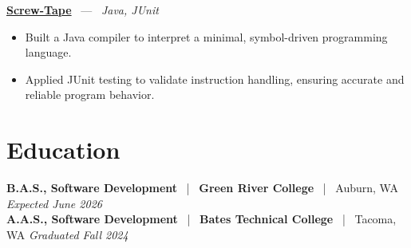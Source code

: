 \documentclass[10pt, letterpaper]{article}
\newcommand{\jobhead}[4]{%
  \vspace{5pt}%
  {\bfseries\color{dark}#1}%
  ~{\color{light}|}~%
  {\bfseries\color{navy}#2}%
  ~{\color{light}|}~%
  {\color{light}#3}%
  \hfill{\color{light}\small\textit{#4}}\\[-2pt]%
}
\newcommand{\projhead}[3]{%
  \vspace{5pt}%
  {\bfseries\color{dark}\href{#2}{#1}}%
  ~{\color{light}---}~%
  {\color{light}\small\textit{#3}}\\[-2pt]%
}
\begin{document}
\projhead{Screw-Tape}{https://github.com/timmyd4/screwtape}{Java, JUnit}
\begin{itemize}
  \item Built a Java compiler to interpret a minimal, symbol-driven programming language.
  \item Applied JUnit testing to validate instruction handling, ensuring accurate and reliable program behavior.
\end{itemize}

\section{Education}

\jobhead{B.A.S., Software Development}{Green River College}{Auburn, WA}{Expected June 2026}
\jobhead{A.A.S., Software Development}{Bates Technical College}{Tacoma, WA}{Graduated Fall 2024}
\end{document}
